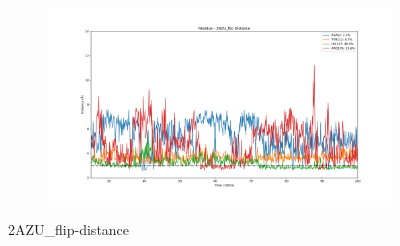 \documentclass[fleqn,10pt]{wlscirep}
\begin{document}
\begin{figure}[!ht]
\begin{subfigure}{.45\textwidth}
   \end{subfigure}
    \begin{subfigure}{.45\textwidth}
     \centering
     \includegraphics[width=.95\linewidth]{2AZU_flip/2AZU_flip-dist_3.png}
   \end{subfigure}
\caption{2AZU_{flip}-distance}
\label{sup:2AZU_flip-dist}
\end{figure}  
\end{document}
